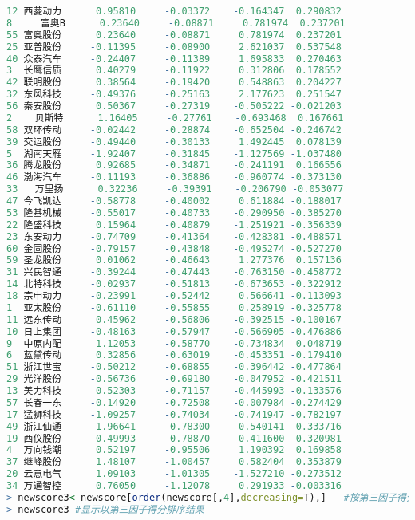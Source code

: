 \documentclass[11pt,a4paper,oneside]{book}
\begin{document}
\begin{lstlisting}[language=r]
12 西菱动力      0.95810     -0.03372    -0.164347  0.290832
8     富奥B      0.23640     -0.08871     0.781974  0.237201
55 富奥股份      0.23640     -0.08871     0.781974  0.237201
25 亚普股份     -0.11395     -0.08900     2.621037  0.537548
40 众泰汽车     -0.24407     -0.11389     1.695833  0.270463
3  长鹰信质      0.40279     -0.11922     0.312806  0.178552
42 联明股份      0.38564     -0.19420     0.548863  0.204227
32 东风科技     -0.49376     -0.25163     2.177623  0.251547
56 秦安股份      0.50367     -0.27319    -0.505222 -0.021203
2    贝斯特      1.16405     -0.27761    -0.693468  0.167661
58 双环传动     -0.02442     -0.28874    -0.652504 -0.246742
39 交运股份     -0.49440     -0.30133     1.492445  0.078139
5  湖南天雁     -1.92407     -0.31845    -1.127569 -1.037480
36 腾龙股份      0.92685     -0.34871    -0.241191  0.166556
46 渤海汽车     -0.11193     -0.36886    -0.960774 -0.373130
33   万里扬      0.32236     -0.39391    -0.206790 -0.053077
47 今飞凯达     -0.58778     -0.40002     0.611884 -0.188017
53 隆基机械     -0.55017     -0.40733    -0.290950 -0.385270
22 隆盛科技      0.15964     -0.40879    -1.251921 -0.356339
23 东安动力     -0.74709     -0.41364    -0.428381 -0.488571
60 金固股份     -0.79157     -0.43848    -0.495274 -0.527270
59 圣龙股份      0.01062     -0.46643     1.277376  0.157136
31 兴民智通     -0.39244     -0.47443    -0.763150 -0.458772
14 北特科技     -0.02937     -0.51813    -0.673653 -0.322912
18 宗申动力     -0.23991     -0.52442     0.566641 -0.113093
1  亚太股份     -0.61110     -0.55855     0.258919 -0.325778
11 远东传动      0.45962     -0.56806    -0.392515 -0.100167
10 日上集团     -0.48163     -0.57947    -0.566905 -0.476886
9  中原内配      1.12053     -0.58770    -0.734834  0.048719
6  蓝黛传动      0.32856     -0.63019    -0.453351 -0.179410
51 浙江世宝     -0.50212     -0.68855    -0.396442 -0.477864
29 光洋股份     -0.56736     -0.69180    -0.047952 -0.421511
13 美力科技      0.52303     -0.71157    -0.445993 -0.133576
57 长春一东     -0.14920     -0.72508    -0.007984 -0.274429
17 猛狮科技     -1.09257     -0.74034    -0.741947 -0.782197
49 浙江仙通      1.96641     -0.78300    -0.540141  0.333716
19 西仪股份     -0.49993     -0.78870     0.411600 -0.320981
4  万向钱潮      0.52197     -0.95506     1.190392  0.169858
37 继峰股份      1.48107     -1.00457     0.582404  0.353879
20 云意电气      1.09103     -1.01305    -1.527210 -0.273512
34 万通智控      0.76050     -1.12078     0.291933 -0.003316
> newscore3<-newscore[order(newscore[,4],decreasing=T),]   #按第三因子得分排序
> newscore3 #显示以第三因子得分排序结果

\end{lstlisting}
\end{document}

